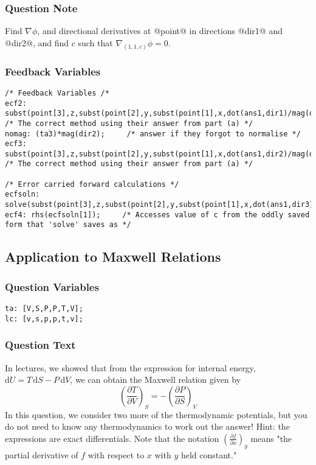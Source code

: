 \documentclass[a4paper,10pt]{article}
\begin{document}
\subsubsection{Question Note}
Find \(\nabla \phi\), and directional derivatives at @point@ in directions @dir1@ and @dir2@, and find \(c\) such that \(\nabla_{(1,1,c)} \phi = 0\).
\subsubsection{Feedback Variables}
\begin{lstlisting}
/* Feedback Variables /*
ecf2: subst(point[3],z,subst(point[2],y,subst(point[1],x,dot(ans1,dir1)/mag(dir1))));     /* The correct method using their answer from part (a) */
nomag: (ta3)*mag(dir2);     /* answer if they forgot to normalise */
ecf3: subst(point[3],z,subst(point[2],y,subst(point[1],x,dot(ans1,dir2)/mag(dir2))));     /* The correct method using their answer from part (a) */

/* Error carried forward calculations */
ecfsoln: solve(subst(point[3],z,subst(point[2],y,subst(point[1],x,dot(ans1,dir3)/mag(dir3))))=0,c);
ecf4: rhs(ecfsoln[1]);     /* Accesses value of c from the oddly saved form that 'solve' saves as */ 
\end{lstlisting}

\subsection{Application to Maxwell Relations}
\subsubsection{Question Variables}
\begin{lstlisting}
ta: [V,S,P,P,T,V];
lc: [v,s,p,p,t,v];
\end{lstlisting}
\subsubsection{Question Text}
In lectures, we showed that from the expression for internal energy, \(\text{d}U = T \, \text{d}S - P \, \text{d}V\), we can obtain the Maxwell relation given by \[\left(\frac{\partial T}{\partial V}\right)_{S} = -\left(\frac{\partial P}{\partial S}\right)_{V}\] In this question, we consider two more of the thermodynamic potentials, but you do not need to know any thermodynamics to work out the answer! Hint: the expressions are exact differentials. Note that the notation $\left(\frac{\partial f}{\partial x}\right)_y$ means "the partial derivative of $f$ with respect to $x$ with $y$ held constant."
\end{document}
